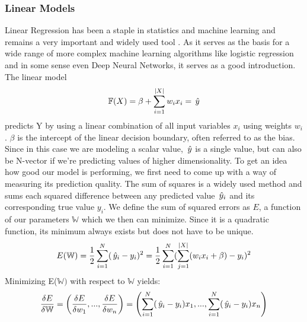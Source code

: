 \subsubsection{Linear Models}
Linear Regression has been a staple in statistics and machine learning and remains a very important and widely used tool \cite{hastie01statisticallearning}. As it serves as the basis for a wide range of more complex machine learning algorithms like logistic regression and in some sense even Deep Neural Networks, it serves as a good introduction. The linear model 
\begin{align*}
	\mathbb{F}(X) =  \beta + \sum_{i=1}^{|X|}w_ix_i = \,\hat{y}
\end{align*} 
predicts Y by using a linear combination of all input variables $x_i$ using weights $w_i$. $\beta$ is the intercept of the linear decision boundary, often referred to as the bias. Since in this case we are modeling a scalar value, $\,\hat{y}$ is a single value, but can also be N-vector if we're predicting values of higher dimensionality. To get an idea how good our model is performing, we first need to come up with a way of measuring its prediction quality. The sum of squares is a widely used method and sums each squared difference between any predicted value $\,\hat{y}_i$ and its corresponding true value $y_i$. We define the sum of squared errors as $E$, a function of our parameters $\mathbb{W}$ which we then can minimize. Since it is a quadratic function, its minimum always exists but does not have to be unique.
\begin{align*}
	E(\mathbb{W}) = \frac{1}{2}\sum_{i=1}^{N}(\,\hat{y}_i - y_i)^2 =
	\frac{1}{2}\sum_{i=1}^{N}(\sum_{j=1}^{|X|}(w_ix_i + \beta) - y_i)^2
\end{align*}
Minimizing E($\mathbb{W})$ with respect to $\mathbb{W}$ yields:
\begin{align*}
	\frac{\delta E}{\delta \mathbb{W}} =  \left(\frac{\delta E}{\delta w_1 },...,\frac{\delta E}{\delta w_n }\right) = \left( \sum_{i=1}^{N}(\,\hat{y}_i - y_i)x_1,...,\sum_{i=1}^{N}(\,\hat{y}_i - y_i)x_n \right)
\end{align*}

